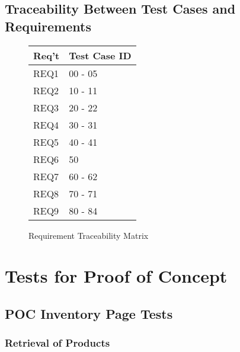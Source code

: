\documentclass[12pt, titlepage]{article}
\begin{document}
\newpage
\subsection{Traceability Between Test Cases and Requirements}
\begin{figure}[h]
\centering

\begin{tabular}{| p{4cm} | p{4cm} |}
\hline
\textbf{Req't} & \textbf{Test Case ID}\\
\hline
REQ1 & 00 - 05\\ \hline

REQ2 & 10 - 11\\ \hline

REQ3 & 20 - 22\\ \hline

REQ4 & 30 - 31\\ \hline

REQ5 & 40 - 41\\ \hline

REQ6 & 50 \\ \hline

REQ7 & 60 - 62\\ \hline
 
REQ8 & 70 - 71\\ \hline

REQ9 & 80 - 84\\ \hline

\hline
\end{tabular}

\caption{Requirement Traceability Matrix}
\label{fig:table2}

\end{figure}


\section{Tests for Proof of Concept}
\label{sec:poc}

\subsection{POC Inventory Page Tests}

\subsubsection{Retrieval of Products}
\end{document}

